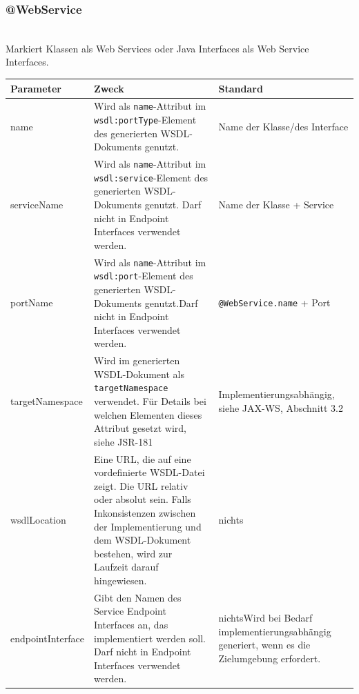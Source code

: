 \documentclass[runningheads]{llncs}
\newcommand{\germanquote}[1]{\glqq{}#1\grqq{}}
\newcommand{\anntabwidth}{\textwidth}
\begin{document}
    \subsubsection{@WebService}\ \\
      Markiert Klassen als Web Services oder Java Interfaces als Web Service Interfaces.\\
    \begin{tabulary}{\anntabwidth}{|l|L|L|}
    \hline
    \textbf{Parameter} & \textbf{Zweck} & \textbf{Standard} \\
    \hline
      name &
      Wird als \texttt{name}-Attribut im \texttt{wsdl:portType}-Element des generierten WSDL-\linebreak[0]Dokuments genutzt. &
      Name der Klasse/\linebreak[0]des Interface \\
    \hline
      serviceName &
      Wird als \texttt{name}-Attribut im \texttt{wsdl:service}-Element des generierten WSDL-\linebreak[0]Dokuments genutzt. Darf nicht in Endpoint Interfaces verwendet werden. &
      Name der Klasse + \germanquote{Ser\-vice} \\
    \hline
      portName &
      Wird als \texttt{name}-Attribut im \texttt{wsdl:port}-Element des generierten WSDL-\linebreak[0]Dokuments genutzt.\newline Darf nicht in Endpoint Interfaces verwendet werden. &
      \texttt{@WebService.name} + \germanquote{Port} \\
    \hline
      targetNamespace &
      Wird im generierten WSDL-Dokument als \texttt{targetNamespace} verwendet. Für Details bei welchen Elementen dieses Attribut gesetzt wird, siehe JSR-181\cite{jsr_181} &
      Im\-ple\-men\-tier\-ungs\-ab\-häng\-ig, siehe JAX-WS\cite{jsr_224}, Abschnitt 3.2 \\
    \hline
      wsdlLocation &
      Eine URL, die auf eine vordefinierte WSDL-Datei zeigt. Die URL relativ oder absolut sein. Falls Inkonsistenzen zwischen der Implementierung und dem WSDL-Dokument bestehen, wird zur Laufzeit darauf hingewiesen. &
      nichts \\
    \hline
      endpointInterface &
      Gibt den Namen des Service Endpoint Interfaces an, das implementiert werden soll. \newline Darf nicht in Endpoint Interfaces verwendet werden. &
      nichts\newline \newline Wird bei Bedarf im\-ple\-men\-tier\-ungs\-ab\-häng\-ig generiert, wenn es die Zielumgebung erfordert. \\
    \hline
    \end{tabulary} \vfill
\end{document}
